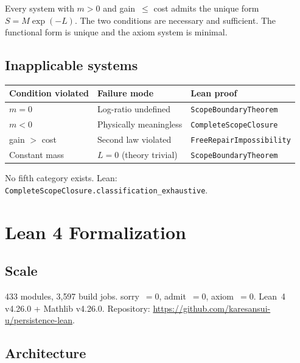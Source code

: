 \documentclass[11pt,a4paper]{article}
\begin{document}
Every system with $m > 0$ and gain~$\leq$ cost admits the unique form $S = M\exp(-L)$. The two conditions are necessary and sufficient. The functional form is unique and the axiom system is minimal.

\subsection{Inapplicable systems}

\begin{center}
\begin{tabular}{lll}
\toprule
Condition violated & Failure mode & Lean proof \\
\midrule
$m = 0$ & Log-ratio undefined & \texttt{ScopeBoundaryTheorem} \\
$m < 0$ & Physically meaningless & \texttt{CompleteScopeClosure} \\
gain $>$ cost & Second law violated & \texttt{FreeRepairImpossibility} \\
Constant mass & $L = 0$ (theory trivial) & \texttt{ScopeBoundaryTheorem} \\
\bottomrule
\end{tabular}
\end{center}

No fifth category exists. Lean: \texttt{CompleteScopeClosure.classification\_exhaustive}.

\section{Lean 4 Formalization}\label{sec:lean}

\subsection{Scale}

433 modules, 3{,}597 build jobs. sorry~$= 0$, admit~$= 0$, axiom~$= 0$. Lean~4 v4.26.0 + Mathlib v4.26.0. Repository: \url{https://github.com/karesansui-u/persistence-lean}.

\subsection{Architecture}
\end{document}
